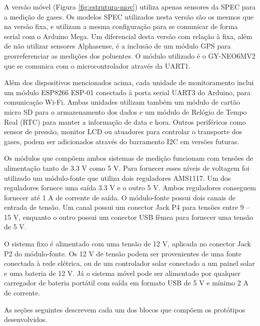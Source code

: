 A versão móvel (Figura \ref{fig:estrutura-mov}) utiliza apenas sensores da SPEC para a medição de gases. Os modelos SPEC utilizados nesta versão são os mesmos que na versão fixa, e utilizam a mesma configuração para se comunicar de forma serial com o Arduino Mega. Um diferencial desta versão com relação à fixa, além de não utilizar sensores Alphasense, é a inclusão de um módulo GPS para georreferenciar as medições dos poluentes. O módulo utilizado é o GY-NEO6MV2 que se comunica com o microcontrolador através da UART1.

Além dos dispositivos mencionados acima, cada unidade de monitoramento inclui um módulo ESP8266 ESP-01 conectado à porta serial UART3 do Arduino, para comunicação Wi-Fi. Ambas unidades utilizam também um módulo de cartão micro SD para o armazenamento dos dados e um módulo de Relógio de Tempo Real (RTC) para manter a informação de data e hora. Outros periféricos como sensor de pressão, monitor LCD ou atuadores para controlar o transporte dos gases, podem ser adicionados através do barramento I2C em versões futuras.

Os módulos que compõem ambos sistemas de medição funcionam com tensões de alimentação tanto de 3.3 V como 5 V. Para fornecer esses níveis de voltagem foi utilizado um módulo-fonte que utiliza dois reguladores AMS1117. Um dos reguladores fornece uma saída 3.3 V e o outro 5 V. Ambos reguladores conseguem fornecer até 1 A de corrente de saída. O módulo-fonte possui dois canais de entrada de tensão. Um canal possui um conector Jack P4 para tensões entre 9 – 15 V, enquanto o outro possui um conector USB fêmea para fornecer uma tensão de 5 V.

O sistema fixo é alimentado com uma tensão de 12 V, aplicada no conector Jack P2 do módulo-fonte. Os 12 V de tensão podem ser provenientes de uma fonte conectada à rede elétrica, ou de um controlador solar conectado a um painel solar e uma bateria de 12 V. Já o sistema móvel pode ser alimentado por qualquer carregador de bateria portátil com saída em formato USB de 5 V e mínimo 2 A de corrente.

As seções seguintes descrevem cada um dos blocos que compõem os protótipos desenvolvidos.

